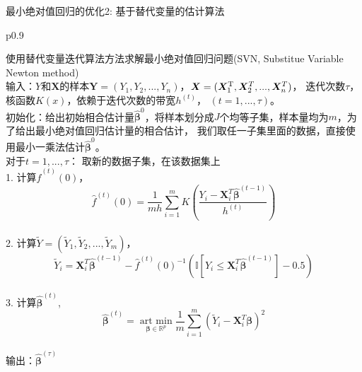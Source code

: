 \begin{frame}{最小绝对值回归的优化2: 基于替代变量的估计算法}
    \begin{table}[H]%
        \centering%
        \tiny
        \begin{tabular}{{p{0.9\columnwidth}}}%
        
        \toprule%
         使用替代变量迭代算法方法求解最小绝对值回归问题(SVN, Substitue Variable Newton method)\\
        \midrule%
        输入：$Y$和$\bm{X}$的样本$\bm{Y} = (Y_1, Y_2, ..., Y_n)$，$\bm{X} = (\bm{X}^{\rm T}_1, \bm{X}^T_2, ..., \bm{X}^T_n)$，
        迭代次数$\tau$，核函数$K(x)$，依赖于迭代次数的带宽$h^{(t)}$，
        $(t = 1, ..., \tau)$。
        \\
        初始化：给出初始相合估计量$\hat{\bm{\beta}}^{0} $，将样本划分成$J$个均等子集，样本量均为$m$，为了给出最小绝对值回归估计量的相合估计，
        我们取任一子集里面的数据，直接使用最小一乘法估计$\hat{\bm{\beta}}^{0}$。
        \\
        对于$t = 1, ..., \tau$：
        取新的数据子集，在该数据集上
        \\
            1. 计算$\hat{f}^{(t)}(0)$，
            $$
            \hat{f}^{(t)}(0) = \frac1{mh}\sum_{i=1}^{m}K(\frac{Y_i - \bm{X}_i^T\hat{\bm{\beta}}^{(t-1)}}{h^{(t)}})
            $$
        \\
            2. 计算$\tilde{Y} = (\tilde Y_1, \tilde Y_2, ..., \tilde Y_m)$，
            $$
            \tilde{Y}_i = \bm{X}^T_i\hat{\bm{\beta}}^{(t-1)} - \hat{f}^{(t)}(0)^{-1}
            (\mathbb{I}[Y_i \leq \bm{X}_i^T \hat{\bm{\beta}}^{(t-1)}] - 0.5)
            $$
        \\
            3. 计算$\hat{\bm{\beta}}^{(t)}$,
            $$
            \hat{\bm{\beta}}^{(t)} = \underset{\bm{\beta} \in \mathbb{R}^{p}}{\operatorname{art\ min}}
            \frac1{m}\sum_{i=1}^m (\tilde{Y}_i - \bm{X}_i^T\bm{\beta})^2
            $$
        \\
        输出：$\hat{\bm{\beta}}^{(\tau)}$
        \\
        \bottomrule%
        \end{tabular}
    \end{table}%
    
\end{frame}

